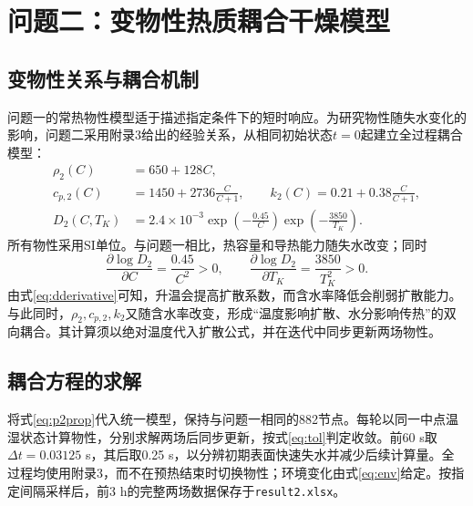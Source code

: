 \section{问题二：变物性热质耦合干燥模型}
\subsection{变物性关系与耦合机制}
问题一的常热物性模型适于描述指定条件下的短时响应。为研究物性随失水变化的影响，问题二采用附录3给出的经验关系，从相同初始状态$t=0$起建立全过程耦合模型：
\begin{align}
\rho_2(C)&=650+128C,\\
c_{p,2}(C)&=1450+2736\frac{C}{C+1},\qquad
k_2(C)=0.21+0.38\frac{C}{C+1},\\
D_2(C,T_K)&=2.4\times10^{-3}\exp\left(-\frac{0.45}{C}\right)
\exp\left(-\frac{3850}{T_K}\right).
\label{eq:p2prop}
\end{align}
所有物性采用SI单位。与问题一相比，热容量和导热能力随失水改变；同时
\begin{equation}
\frac{\partial\log D_2}{\partial C}=\frac{0.45}{C^2}>0,
\qquad \frac{\partial\log D_2}{\partial T_K}=\frac{3850}{T_K^2}>0.
\label{eq:dderivative}
\end{equation}
由式\eqref{eq:dderivative}可知，升温会提高扩散系数，而含水率降低会削弱扩散能力。与此同时，$\rho_2,c_{p,2},k_2$又随含水率改变，形成“温度影响扩散、水分影响传热”的双向耦合。其计算须以绝对温度代入扩散公式，并在迭代中同步更新两场物性。

\subsection{耦合方程的求解}
将式\eqref{eq:p2prop}代入统一模型，保持与问题一相同的882节点。每轮以同一中点温湿状态计算物性，分别求解两场后同步更新，按式\eqref{eq:tol}判定收敛。前60 s取$\Delta t=0.03125$ s，其后取0.25 s，以分辨初期表面快速失水并减少后续计算量。全过程均使用附录3，而不在预热结束时切换物性；环境变化由式\eqref{eq:env}给定。按指定间隔采样后，前3 h的完整两场数据保存于\texttt{result2.xlsx}。

